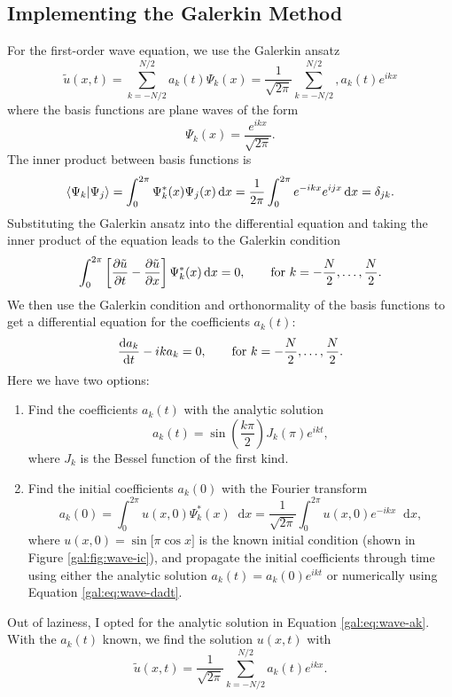 \documentclass[11pt, a4paper]{article}
\newcommand{\diff}{\mathop{}\!\mathrm{d}} %
\renewcommand{\t}[1]{\tilde{#1}}
\begin{document}
\subsection{Implementing the Galerkin Method}
For the first-order wave equation, we use the Galerkin ansatz
\begin{equation*}
	\t{u}(x, t) = \sum_{k=-N/2}^{N/2} a_{k}(t) \Psi_{k}(x) = \frac{1}{\sqrt{2\pi}}\sum_{k=-N/2}^{N/2}, a_{k}(t)e^{ikx}
\end{equation*}
where the basis functions are plane waves of the form
\begin{equation}
	\Psi_{k}(x) = \frac{e^{ikx}}{\sqrt{2\pi}}. \label{gal:eq:wave-basis}
\end{equation}
The inner product between basis functions is
\begin{equation*}
	\ip{\Psi_{k}}{\Psi_{j}} = \int_{0}^{2\pi}\Psi_{k}^{*}(x)\Psi_{j}(x)\diff x = \frac{1}{2\pi} \int_{0}^{2\pi}e^{-ikx}e^{ijx}\diff x = \delta_{jk}.
\end{equation*}
Substituting the Galerkin ansatz into the differential equation and taking the inner product of the equation leads to the Galerkin condition
\begin{equation*}
	\int_{0}^{2\pi}\left[\pdv{\t{u}}{t} - \pdv{\t{u}}{x}\right]\Psi_{k}^{*}(x)\diff x = 0, \qquad \text{for } k = - \frac{N}{2}, \ldots, \frac{N}{2}.
\end{equation*}
We then use the Galerkin condition and orthonormality of the basis functions to get a differential equation for the coefficients $ a_{k}(t) $:
\begin{equation}
	\dv{a_{k}}{t} - ika_{k} = 0, \qquad \text{for } k = - \frac{N}{2}, \ldots, \frac{N}{2}. \label{gal:eq:wave-dadt}
\end{equation}
Here we have two options:
\begin{enumerate}
	\item Find the coefficients $ a_{k}(t) $ with the analytic solution
	\begin{equation}
		a_{k}(t) = \sin \left(\frac{k\pi}{2}\right)J_{k}(\pi)e^{ikt}, \label{gal:eq:wave-ak}
	\end{equation}
	where $ J_{k} $ is the Bessel function of the first kind.
	
	\item Find the initial coefficients $ a_{k}(0) $ with the Fourier transform
	\begin{equation*}
		a_{k}(0) = \int_{0}^{2\pi}u(x, 0)\Psi_{k}^{*}(x) \diff x = \frac{1}{\sqrt{2\pi}}\int_{0}^{2\pi}u(x, 0)e^{-ikx}\diff x,
	\end{equation*}
	where $ u(x, 0) = \sin\big[\pi \cos x \big] $ is the known initial condition (shown in Figure \ref{gal:fig:wave-ic}), and propagate the initial coefficients through time using either the analytic solution $ a_{k}(t) = a_{k}(0)e^{ikt} $ or numerically using Equation \ref{gal:eq:wave-dadt}.
\end{enumerate}
Out of laziness, I opted for the analytic solution in Equation \ref{gal:eq:wave-ak}. With the $ a_{k}(t) $ known, we find the solution $ u(x, t) $ with 
\begin{equation*}
	\t{u}(x, t) = \frac{1}{\sqrt{2\pi}}\sum_{k=-N/2}^{N/2} a_{k}(t)e^{ikx}.
\end{equation*}	
\end{document}
